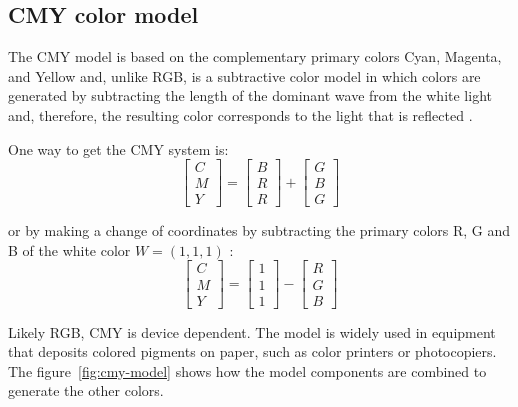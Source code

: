 \subsection{CMY color model}
\label{sec:modelo_cores_cmy}

The CMY model is based on the complementary primary colors Cyan, Magenta, and Yellow and, unlike RGB, is a subtractive color model in which colors are generated by subtracting the length of the dominant wave from the white light and, therefore, the resulting color corresponds to the light that is reflected \citep{gonzalez:02}.

One way to get the CMY system is:\\
\begin{equation}
  \begin{bmatrix}
    C \\ M \\ Y
  \end{bmatrix} = 
  \begin{bmatrix}
    B \\ R \\ R
  \end{bmatrix} +
  \begin{bmatrix}
    G \\ B \\ G
  \end{bmatrix}
\end{equation}

\noindent or by making a change of coordinates by subtracting the primary colors R, G and B of the white color $W = (1, 1, 1)$ \citep{gonzalez:02}:
\begin{equation}
  \begin{bmatrix}
    C \\ M \\ Y
  \end{bmatrix} = 
  \begin{bmatrix}
    1 \\ 1 \\ 1
  \end{bmatrix} -
  \begin{bmatrix}
    R \\ G \\ B
  \end{bmatrix}
\end{equation}

Likely RGB, CMY is device dependent. The model is widely used in equipment that deposits colored pigments on paper, such as color printers or photocopiers. The figure~\ref{fig:cmy-model} shows how the model components are combined to generate the other colors.

